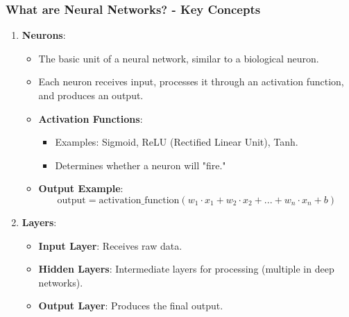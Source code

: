 \documentclass[aspectratio=169]{beamer}
\begin{document}
\begin{frame}[fragile]
    \frametitle{What are Neural Networks? - Key Concepts}
    \begin{enumerate}
        \item \textbf{Neurons}:
            \begin{itemize}
                \item The basic unit of a neural network, similar to a biological neuron.
                \item Each neuron receives input, processes it through an activation function, and produces an output.
                \item \textbf{Activation Functions}:
                    \begin{itemize}
                        \item Examples: Sigmoid, ReLU (Rectified Linear Unit), Tanh.
                        \item Determines whether a neuron will "fire."
                    \end{itemize}
                \item \textbf{Output Example}:
                    \begin{equation}
                        \text{output} = \text{activation\_function}(w_1 \cdot x_1 + w_2 \cdot x_2 + ... + w_n \cdot x_n + b)
                    \end{equation}
            \end{itemize}
        \item \textbf{Layers}:
            \begin{itemize}
                \item \textbf{Input Layer}: Receives raw data.
                \item \textbf{Hidden Layers}: Intermediate layers for processing (multiple in deep networks).
                \item \textbf{Output Layer}: Produces the final output. 
            \end{itemize}
    \end{enumerate}
\end{frame}
\end{document}
